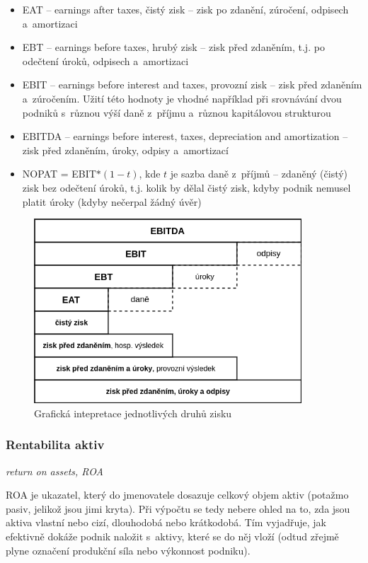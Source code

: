 \begin{itemize}
\item EAT -- earnings after taxes, čistý zisk -- zisk po zdanění, zúročení, odpisech a~amortizaci

\item EBT -- earnings before taxes, hrubý zisk -- zisk před zdaněním, t.j. po odečtení úroků, odpisech a~amortizaci

\item EBIT -- earnings before interest and taxes, provozní zisk -- zisk před zdaněním a~zúročením. Užití této hodnoty je vhodné například při srovnávání dvou podniků s~různou výší daně z~příjmu a~různou kapitálovou strukturou

\item EBITDA -- earnings before interest, taxes, depreciation and amortization -- zisk před zdaněním, úroky, odpisy a~amortizací

\item NOPAT = EBIT$*(1-t)$, kde $t$ je sazba daně z~příjmů  -- zdaněný (čistý) zisk bez odečtení úroků, t.j. kolik by dělal čistý zisk, kdyby podnik nemusel platit úroky (kdyby nečerpal žádný úvěr)
\end{itemize}


\begin{figure}
  \centering
  \includegraphics[width=10cm]{img/zisk.png}
  \caption{Grafická intepretace jednotlivých druhů zisku}
\end{figure}

\subsubsection{Rentabilita aktiv}
\textit{return on assets, ROA}

ROA je ukazatel, který do jmenovatele dosazuje celkový objem aktiv (potažmo pasiv, jelikož jsou jimi kryta). Při výpočtu se tedy nebere ohled na to, zda jsou aktiva vlastní nebo cizí, dlouhodobá nebo krátkodobá. Tím vyjadřuje, jak efektivně dokáže podnik naložit s~aktivy, které se do něj vloží (odtud zřejmě plyne označení produkční síla nebo výkonnost podniku).

